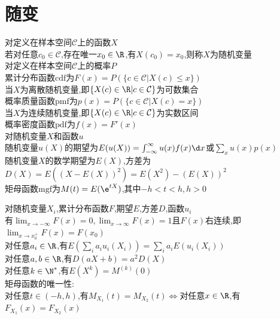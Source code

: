 

%

\setcounter{section}{0}
\setcounter{subsection}{0}

\chapter{随变}

\begin{dingyi}
对定义在样本空间$\mathcal{C}$上的函数$X$\\
若对任意$c_0\in \mathcal{C}$,存在唯一$x_0\in \R$,有$X(c_0)=x_0$,则称$X$为随机变量\\
对定义在样本空间$\mathcal{C}$上的概率$P$\\
累计分布函数$\mathrm{cdf}$为$F(x)=P(\{c\in\mathcal{C}|X(c)\leq x\})$\\
当$X$为离散随机变量,即$\{X(c)\in\R|c\in\mathcal{C}\}$为可数集合\\
概率质量函数$\mathrm{pmf}$为$p(x)=P(\{c\in\mathcal{C}|X(c)=x\})$\\
当$X$为连续随机变量,即$\{X(c)\in\R|c\in\mathcal{C}\}$为实数区间\\
概率密度函数$\mathrm{pdf}$为$f(x)=F'(x)$\\
对随机变量$X$和函数$u$\\
随机变量$u(X)$的期望为$E(u(X))=\int_{-\infty}^{\infty}u(x)f(x)\d x$或$\sum\limits_{x}u(x)p(x)$\\
随机变量$X$的数学期望为$E(X)$,方差为$D(X)=E((X-E(X))^2)=E(X^2)-(E(X))^2$\\
矩母函数$\mathrm{mgf}$为$M(t)=E(\e^{tX})$,其中$-h<t<h,h>0$
\end{dingyi}

\begin{dingli}
对随机变量$X_i$,累计分布函数$F$,期望$E$,方差$D$,函数$u_i$\\
有$\lim_{x\to-\infty}F(x)=0,\lim_{x\to\infty}F(x)=1$且$F(x)$右连续,即$\lim_{x\to x_0^{+}}F(x)=F(x_0)$\\
对任意$a_i\in \R$,有$E(\sum\limits_{i}a_iu_i(X_i))=\sum\limits_{i}a_iE(u_i(X_i))$\\
对任意$a,b\in \R$,有$D(aX+b)=a^2D(X)$\\
对任意$k\in \N^*$,有$E(X^k)=M^{(k)}(0)$\\
矩母函数的唯一性:\\
对任意$t\in (-h,h)$,有$M_{X_1}(t)=M_{X_2}(t)\Leftrightarrow$对任意$x\in \R$,有$F_{X_1}(x)=F_{X_2}(x)$
\end{dingli}


